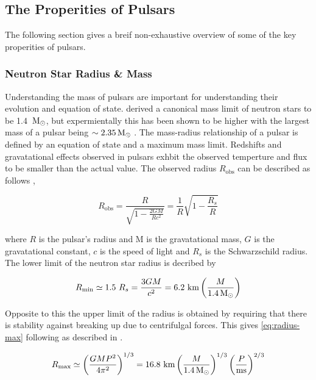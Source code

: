 \subsection{The Properities of Pulsars}

The following section gives a breif non-exhaustive overview of some of the key properities of pulsars. 

\subsubsection{Neutron Star Radius \& Mass}

Understanding the mass of pulsars are important for understanding their evolution and equation of state. \cite{oppenheimer_massive_1939} derived a canonical mass limit of neutron stars to be 1.4 $\, \text{M}_\odot$, but expermientally this has been shown to be higher with the largest mass of a pulsar being $\sim 2.35 \, \text{M}_\odot$ \citep{Romani_2022}. The mass-radius relationship of a pulsar is defined by an equation of state and a maximum mass limit. Redshifts and gravatational effects observed in pulsars exhbit the observed temperture and flux to be smaller than the actual value. The observed radius $R_\text{obs}$ can be described as follows \citep{pulsar_handbook}, 

\begin{equation}
    R_\text{obs} = \frac{R}{\sqrt{1 - \frac{2GM}{Rc^2}}} = \frac{1}{R} \sqrt{1 - \frac{R_s}{R}}
\end{equation}

where $R$ is the pulsar's radius and M is the gravatational mass, $G$ is the gravatational constant, $c$ is the speed of light and $R_s$ is the Schwarzschild radius. \\ 
The lower limit of the neutron star radius is decribed by 

\begin{equation}
    R_\text{min} \simeq 1.5 \ R_s = \frac{3GM}{c^2} = 6.2 \ \text{km} \left( \frac{M}{1.4 \, \text{M}_\odot} \right)
\end{equation}

Opposite to this the
 upper limit of the radius is obtained by requiring that there is stability against breaking up due to centrifulgal forces. This gives \cref{eq:radius-max} following as described in \cite[p.~58]{pulsar_handbook}. 

\begin{equation}
    R_\text{max} \simeq \left(\frac{GMP^2}{4 \pi^2}\right)^{1/3} = 16.8 \ \text{km} \left( \frac{M}{1.4 \, \text{M}_\odot} \right)^{1/3} \left( \frac{P}{\text{ms}} \right)^{2/3}
    \label{eq:radius-max}
\end{equation}

